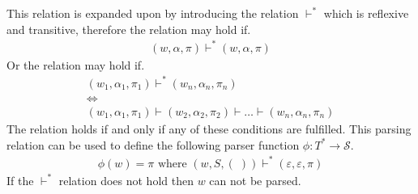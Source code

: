 This relation is expanded upon by introducing the relation $\vdash^*$ which is reflexive and transitive, therefore the relation may hold if.
\begin{gather*}
    (w, \alpha, \pi) \vdash^* (w, \alpha, \pi)
\end{gather*}
Or the relation may hold if.
\begin{gather*}
    (w_1, \alpha_1, \pi_1) \vdash^*  (w_n, \alpha_n, \pi_n) \\ \iff \\ (w_1, \alpha_1, \pi_1) \vdash (w_2, \alpha_2, \pi_2) \vdash \dots \vdash (w_n, \alpha_n, \pi_n)
\end{gather*}
The relation holds if and only if any of these conditions are fulfilled. This parsing relation can be used to define the following parser function $\phi: T^* \to \mathcal{S}$.
\begin{align*}
    \phi(w) = \pi \text{ where } (w, S, (\;)) \vdash^* (\varepsilon, \varepsilon, \pi) 
\end{align*}
If the $\vdash^*$ relation does not hold then $w$ can not be parsed. 